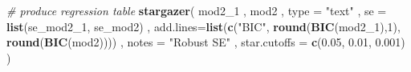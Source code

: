 \documentclass[]{article}
\newenvironment{Shaded}{\begin{snugshade}}{\end{snugshade}}
\newcommand{\CommentTok}[1]{\textcolor[rgb]{0.56,0.35,0.01}{\textit{#1}}}
\newcommand{\DataTypeTok}[1]{\textcolor[rgb]{0.13,0.29,0.53}{#1}}
\newcommand{\DecValTok}[1]{\textcolor[rgb]{0.00,0.00,0.81}{#1}}
\newcommand{\FloatTok}[1]{\textcolor[rgb]{0.00,0.00,0.81}{#1}}
\newcommand{\KeywordTok}[1]{\textcolor[rgb]{0.13,0.29,0.53}{\textbf{#1}}}
\newcommand{\NormalTok}[1]{#1}
\newcommand{\StringTok}[1]{\textcolor[rgb]{0.31,0.60,0.02}{#1}}
\begin{document}
\begin{Shaded}
\begin{Highlighting}[]
\CommentTok{# produce regression table}
\KeywordTok{stargazer}\NormalTok{(}
\NormalTok{    mod2_}\DecValTok{1}
\NormalTok{  , mod2}
\NormalTok{  , }\DataTypeTok{type =} \StringTok{"text"}
\NormalTok{  , }\DataTypeTok{se =} \KeywordTok{list}\NormalTok{(se_mod2_}\DecValTok{1}\NormalTok{, se_mod2)}
\NormalTok{  , }\DataTypeTok{add.lines=}\KeywordTok{list}\NormalTok{(}\KeywordTok{c}\NormalTok{(}\StringTok{"BIC"}\NormalTok{, }\KeywordTok{round}\NormalTok{(}\KeywordTok{BIC}\NormalTok{(mod2_}\DecValTok{1}\NormalTok{),}\DecValTok{1}\NormalTok{), }\KeywordTok{round}\NormalTok{(}\KeywordTok{BIC}\NormalTok{(mod2))))}
\NormalTok{  , }\DataTypeTok{notes =} \StringTok{"Robust SE"}
\NormalTok{  , }\DataTypeTok{star.cutoffs =} \KeywordTok{c}\NormalTok{(}\FloatTok{0.05}\NormalTok{, }\FloatTok{0.01}\NormalTok{, }\FloatTok{0.001}\NormalTok{)}
\NormalTok{  )}
\end{Highlighting}
\end{Shaded}
\end{document}
